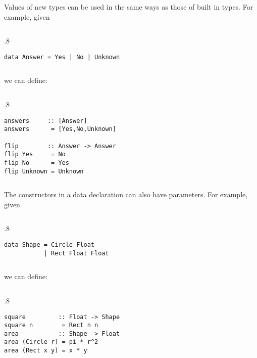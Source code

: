 \documentclass{beamer}
\newenvironment{codeblock}[1][.8]{%
\begin{columns}
\begin{column}{#1\linewidth}
\begin{exampleblock}{}}{%
\end{exampleblock}
\end{column}
\end{columns}}
\def\slideskip{\vskip 0.1in}
\begin{document}
\begin{frame}[fragile]
\large

Values of new types can be used in the same ways 
as those of built in types.  For example, given
\slideskip

\begin{codeblock}
\begin{verbatim}
data Answer = Yes | No | Unknown 
\end{verbatim}
\end{codeblock}

\slideskip
we can define:
\slideskip

\begin{codeblock}
\begin{verbatim}
answers     :: [Answer] 
answers      = [Yes,No,Unknown] 

flip        :: Answer -> Answer 
flip Yes     = No 
flip No      = Yes 
flip Unknown = Unknown 
\end{verbatim}
\end{codeblock}

\end{frame}

\begin{frame}[fragile]
\large

The constructors in a data declaration can also have 
parameters.  For example, given 
\slideskip

\begin{codeblock}
\begin{verbatim}
data Shape = Circle Float 
           | Rect Float Float 
\end{verbatim}
\end{codeblock}

\slideskip
we can define:
\slideskip

\begin{codeblock}
\begin{verbatim}
square         :: Float -> Shape 
square n        = Rect n n 
area           :: Shape -> Float 
area (Circle r) = pi * r^2 
area (Rect x y) = x * y 
\end{verbatim}
\end{codeblock}

\end{frame}
\end{document}

